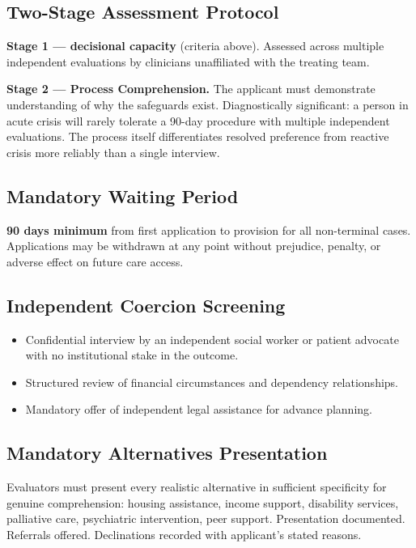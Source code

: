 \documentclass[11pt, letterpaper]{article}
\begin{document}
\subsection{Two-Stage Assessment Protocol}

\textbf{Stage 1 --- decisional capacity} (criteria above). Assessed across multiple
independent evaluations by clinicians unaffiliated with the treating team.

\textbf{Stage 2 --- Process Comprehension.} The applicant must demonstrate understanding of
why the safeguards exist. Diagnostically significant: a person in acute crisis will rarely
tolerate a 90-day procedure with multiple independent evaluations. The process itself
differentiates resolved preference from reactive crisis more reliably than a single interview.

\subsection{Mandatory Waiting Period}

\textbf{90 days minimum} from first application to provision for all non-terminal cases.
Applications may be withdrawn at any point without prejudice, penalty, or adverse effect
on future care access.

\subsection{Independent Coercion Screening}

\begin{itemize}
  \item Confidential interview by an independent social worker or patient advocate
    with no institutional stake in the outcome.
  \item Structured review of financial circumstances and dependency relationships.
  \item Mandatory offer of independent legal assistance for advance planning.
\end{itemize}

\subsection{Mandatory Alternatives Presentation}

Evaluators must present every realistic alternative in sufficient specificity for genuine
comprehension: housing assistance, income support, disability services, palliative care,
psychiatric intervention, peer support. Presentation documented. Referrals offered.
Declinations recorded with applicant's stated reasons.
\end{document}

